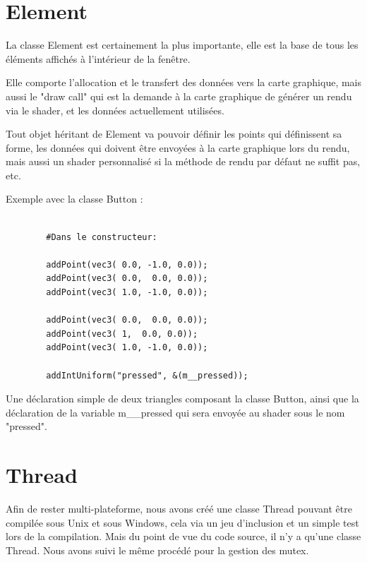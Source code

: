 \documentclass[a4paper]{report}
\begin{document}
    \section{Element}

        La classe Element est certainement la plus importante, elle est la base de tous les éléments affichés à
        l'intérieur de la fenêtre.

    \vspace{5mm}

        Elle comporte l'allocation et le transfert des données vers la carte graphique, mais aussi le "draw call" qui
        est la demande à la carte graphique de générer un rendu via le shader, et les données actuellement utilisées.

    \vspace{5mm}

        Tout objet héritant de Element va pouvoir définir les points qui définissent sa forme, les données qui doivent
        être envoyées à la carte graphique lors du rendu, mais aussi un shader personnalisé si la méthode de rendu par
        défaut ne suffit pas, etc.

    \vspace{5mm}

        Exemple avec la classe Button :

    \begin{lstlisting}

        #Dans le constructeur:

        addPoint(vec3( 0.0, -1.0, 0.0));
        addPoint(vec3( 0.0,  0.0, 0.0));
        addPoint(vec3( 1.0, -1.0, 0.0));

        addPoint(vec3( 0.0,  0.0, 0.0));
        addPoint(vec3( 1,  0.0, 0.0));
        addPoint(vec3( 1.0, -1.0, 0.0));

        addIntUniform("pressed", &(m__pressed));

    \end{lstlisting}

    Une déclaration simple de deux triangles composant la classe Button,
    ainsi que la déclaration de la variable m\_\_pressed qui sera envoyée au shader sous le nom "pressed".

    \section{Thread}

        Afin de rester multi-plateforme, nous avons créé une classe Thread pouvant être compilée sous Unix et sous
        Windows, cela via un jeu d'inclusion et un simple test lors de la compilation. Mais du point de vue du code
        source, il n'y a qu'une classe Thread. Nous avons suivi le même procédé pour la gestion des mutex.
\end{document}

